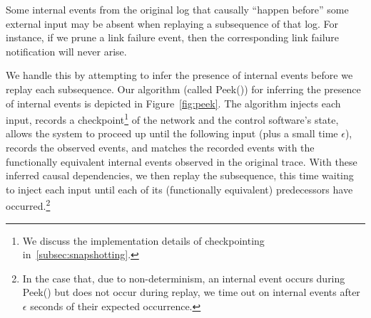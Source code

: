 
 Some internal events from the original
log that causally ``happen before'' some external input
may be absent when replaying a subsequence of that log.
For instance, if we prune a link failure event, then
the corresponding link failure notification will never arise.

We handle this by attempting to infer the presence of internal
events before we replay each subsequence. Our algorithm (called {\sc Peek()}) for inferring the
presence of internal events is depicted in
Figure~\ref{fig:peek}. The algorithm injects each input, records a checkpoint\footnote{We discuss the implementation details of checkpointing
in~\ref{subsec:snapshotting}.} of
the network and the control software's state, allows the system to proceed up
until the following input (plus a small time $\epsilon$), records the observed
events, and matches the
recorded events with the functionally equivalent internal events observed in
the original trace. With these inferred causal dependencies, we then replay
the subsequence, this time waiting to inject each input until each of its
(functionally equivalent) predecessors have occurred.\footnote{In the
case that, due
to non-determinism, an internal event occurs during {\sc Peek()} but does not occur
during replay, we time out on internal events after $\epsilon$ seconds of
their expected occurrence.}

